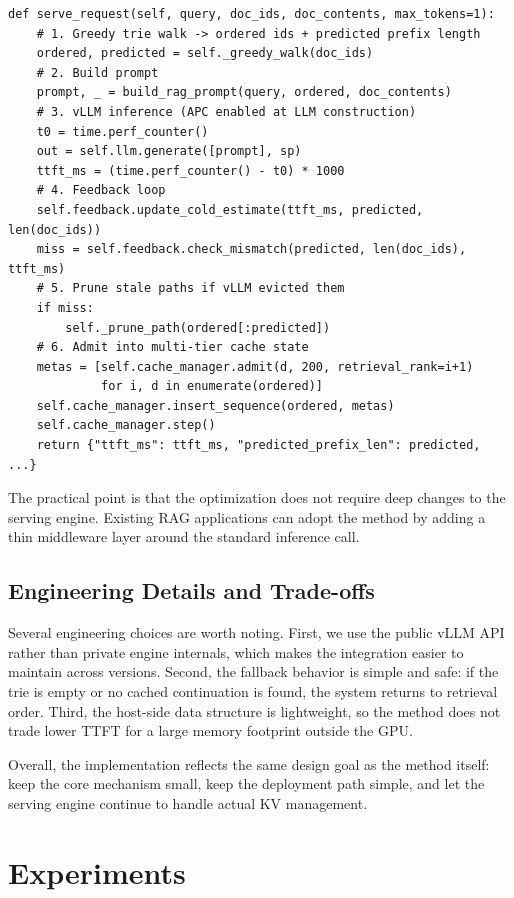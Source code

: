\documentclass{article}
\begin{document}
\begin{lstlisting}[caption={\texttt{VLLMCacheProxy.serve\_request} (abridged).},label={lst:serve}]
def serve_request(self, query, doc_ids, doc_contents, max_tokens=1):
    # 1. Greedy trie walk -> ordered ids + predicted prefix length
    ordered, predicted = self._greedy_walk(doc_ids)
    # 2. Build prompt
    prompt, _ = build_rag_prompt(query, ordered, doc_contents)
    # 3. vLLM inference (APC enabled at LLM construction)
    t0 = time.perf_counter()
    out = self.llm.generate([prompt], sp)
    ttft_ms = (time.perf_counter() - t0) * 1000
    # 4. Feedback loop
    self.feedback.update_cold_estimate(ttft_ms, predicted, len(doc_ids))
    miss = self.feedback.check_mismatch(predicted, len(doc_ids), ttft_ms)
    # 5. Prune stale paths if vLLM evicted them
    if miss:
        self._prune_path(ordered[:predicted])
    # 6. Admit into multi-tier cache state
    metas = [self.cache_manager.admit(d, 200, retrieval_rank=i+1)
             for i, d in enumerate(ordered)]
    self.cache_manager.insert_sequence(ordered, metas)
    self.cache_manager.step()
    return {"ttft_ms": ttft_ms, "predicted_prefix_len": predicted, ...}
\end{lstlisting}

The practical point is that the optimization does not require deep changes to the serving engine. Existing RAG applications can adopt the method by adding a thin middleware layer around the standard inference call.

\subsection{Engineering Details and Trade-offs}

Several engineering choices are worth noting. First, we use the public vLLM API rather than private engine internals, which makes the integration easier to maintain across versions. Second, the fallback behavior is simple and safe: if the trie is empty or no cached continuation is found, the system returns to retrieval order. Third, the host-side data structure is lightweight, so the method does not trade lower TTFT for a large memory footprint outside the GPU.

Overall, the implementation reflects the same design goal as the method itself: keep the core mechanism small, keep the deployment path simple, and let the serving engine continue to handle actual KV management.


\section{Experiments}
\label{sec:eval}
\end{document}
